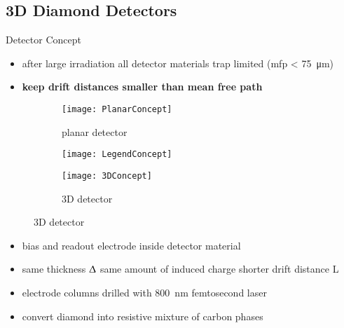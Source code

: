 \subsection{3D Diamond Detectors}
\begin{frame}{Detector Concept}

	\vspace*{-5pt}
	\begin{itemize}
		\itemfill
		\item after large irradiation \ra all detector materials trap limited (mfp < \SI{75}{\micro\meter})
		\item {} \textbf{keep drift distances smaller than mean free path}
	\end{itemize}

	\vspace*{-10pt}
	\begin{figure} 
		\begin{center}
			\begin{subfigure}{0.4\textwidth}  
				\centering 
				\texttt{[image: PlanarConcept]}
				\caption{planar detector}
			\end{subfigure}
			\begin{subfigure}{0.1\textwidth}  
				\centering 
				\texttt{[image: LegendConcept]}
				\vspace*{20pt}
			\end{subfigure}
			\begin{subfigure}{0.4\textwidth} 
				\centering 
				\texttt{[image: 3DConcept]}
				\caption{3D detector} 	
			\end{subfigure} 
		\end{center}
	\end{figure}\vspace*{-15pt}
	
	\begin{itemize}
		\itemfill
		\item bias and readout electrode inside detector material
		\item same thickness $\Updelta$ \ra same amount of induced charge \ra shorter drift distance L
		\item electrode columns drilled with \SI{800}{\nano\meter} femtosecond laser 
		\item convert diamond into resistive mixture of carbon phases
	\end{itemize}

\end{frame}

